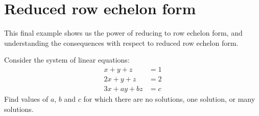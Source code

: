 \documentclass{ximera}
\begin{document}



\section{Reduced row echelon form}




This final example shows us the power of reducing to row echelon form, and understanding the consequences with respect to reduced row echelon form.

\begin{example}
  Consider the system of linear equations:
  \begin{align*}
    x+y+z &=  1\\
    2x+y+z &=  2\\
    3x+ay+bz &= c
  \end{align*}
  Find values of $a$, $b$ and $c$ for which there are no solutions,
  one solution, or many solutions.
  \begin{solution}
  \end{solution}
\end{example}
\end{document}
